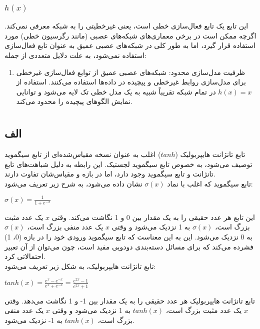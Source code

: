 \documentclass{article}
\begin{document}
\subsubsection{$h(x)$}

این تابع یک تابع فعال‌سازی خطی است، یعنی غیرخطیتی را به شبکه معرفی نمی‌کند. اگرچه ممکن است در برخی معماری‌های شبکه‌های عصبی (مانند رگرسیون خطی) مورد استفاده قرار گیرد، اما به طور کلی در شبکه‌های عصبی عمیق به عنوان تابع فعال‌سازی استفاده نمی‌شود، به علت دلایل متعددی از جمله:
\begin{enumerate}
\item    ظرفیت مدل‌سازی محدود: شبکه‌های عصبی عمیق از توابع فعال‌سازی غیرخطی برای مدل‌سازی روابط غیرخطی و پیچیده در داده‌ها استفاده می‌کنند. استفاده از $h(x) = x$ در تمام شبکه تقریباً شبیه به یک مدل خطی تک لایه می‌شود و توانایی نمایش الگوهای پیچیده را محدود می‌کند.
\end{enumerate}

\section{}
\subsection{الف}
تابع تانژانت هایپربولیک ($tanh$) اغلب به عنوان نسخه مقیاس‌شده‌ای از تابع سیگموید توصیف می‌شود، به خصوص تابع سیگموید لجستیک. این رابطه به دلیل شباهت‌های تابع تانژانت و تابع سیگموید وجود دارد، اما در بازه و مقیاس‌شان تفاوت دارند.\\
تابع سیگموید که اغلب با نماد $\sigma\left( x \right)$ نشان داده می‌شود، به شرح زیر تعریف می‌شود:
\begin{latin}
$
\sigma\left( x \right) = \frac{1}{1 + e ^ {-x}}
$
\end{latin}
این تابع هر عدد حقیقی را به یک مقدار بین 0 و 1 نگاشت می‌کند. وقتی $x$ یک عدد مثبت بزرگ است، $\sigma\left( x \right)$ به 1 نزدیک می‌شود و وقتی $x$ یک عدد منفی بزرگ است، $\sigma\left( x \right)$ به 0 نزدیک می‌شود. این به این معناست که تابع سیگموید ورودی خود را در بازه (0، 1) فشرده می‌کند که برای مسائل دسته‌بندی دودویی مفید است، چون می‌توان از آن تعبیر احتمالاتی کرد.\\
تابع تانژانت هایپربولیک، به شکل زیر تعریف می‌شود:
\begin{latin}
$
tanh(x) = \frac{e^x - e^{-x}}{e^x + e^{-x}} = \frac{e ^ {2x} - 1}{e ^ {2x} + 1}
$
\end{latin}
تابع تانژانت هایپربولیک هر عدد حقیقی را به یک مقدار بین 1- و 1 نگاشت می‌دهد. وقتی $x$ یک عدد مثبت بزرگ است، $tanh(x)$ به 1 نزدیک می‌شود و وقتی $x$ یک عدد منفی بزرگ است، $tanh(x)$ به 1- نزدیک می‌شود.\\
\end{document}
